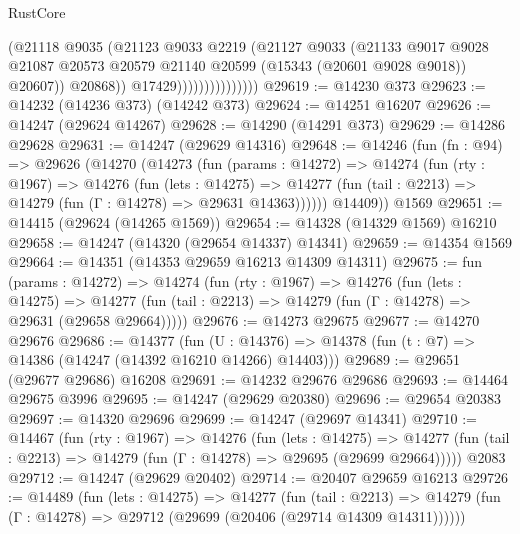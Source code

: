 \begin{lexlean}{RustCore}
\begin{coremodule}
                                  (@21118
                                    @9035
                                    (@21123
                                      @9033
                                      @2219
                                      (@21127
                                        @9033
                                        (@21133
                                          @9017
                                          @9028
                                          @21087
                                          @20573
                                          @20579
                                          @21140
                                          @20599
                                          (@15343 (@20601 @9028 @9018))
                                          @20607))
                                      @20868))
                                  @17429)))))))))))))))
@29619 := @14230 @373
@29623 := @14232 (@14236 @373) (@14242 @373)
@29624 := @14251 @16207
@29626 := @14247 (@29624 @14267)
@29628 := @14290 (@14291 @373)
@29629 := @14286 @29628
@29631 := @14247 (@29629 @14316)
@29648 := @14246
    (fun (fn : @94) =>
    @29626
      (@14270
        (@14273
          (fun (params : @14272) =>
          @14274
            (fun (rty : @1967) =>
            @14276
              (fun (lets : @14275) =>
              @14277 (fun (tail : @2213) => @14279 (fun (Γ : @14278) => @29631 @14363))))))
        @14409))
    @1569
@29651 := @14415 (@29624 (@14265 @1569))
@29654 := @14328 (@14329 @1569) @16210
@29658 := @14247 (@14320 (@29654 @14337) @14341)
@29659 := @14354 @1569
@29664 := @14351 (@14353 @29659 @16213 @14309 @14311)
@29675 := fun (params : @14272) =>
  @14274
    (fun (rty : @1967) =>
    @14276
      (fun (lets : @14275) =>
      @14277 (fun (tail : @2213) => @14279 (fun (Γ : @14278) => @29631 (@29658 @29664)))))
@29676 := @14273 @29675
@29677 := @14270 @29676
@29686 := @14377
    (fun (U : @14376) => @14378 (fun (t : @7) => @14386 (@14247 (@14392 @16210 @14266) @14403)))
@29689 := @29651 (@29677 @29686) @16208
@29691 := @14232 @29676 @29686
@29693 := @14464 @29675 @3996
@29695 := @14247 (@29629 @20380)
@29696 := @29654 @20383
@29697 := @14320 @29696
@29699 := @14247 (@29697 @14341)
@29710 := @14467
    (fun (rty : @1967) =>
    @14276
      (fun (lets : @14275) =>
      @14277 (fun (tail : @2213) => @14279 (fun (Γ : @14278) => @29695 (@29699 @29664)))))
    @2083
@29712 := @14247 (@29629 @20402)
@29714 := @20407 @29659 @16213
@29726 := @14489
    (fun (lets : @14275) =>
    @14277
      (fun (tail : @2213) =>
      @14279 (fun (Γ : @14278) => @29712 (@29699 (@20406 (@29714 @14309 @14311))))))

\end{coremodule}
\end{lexlean}
